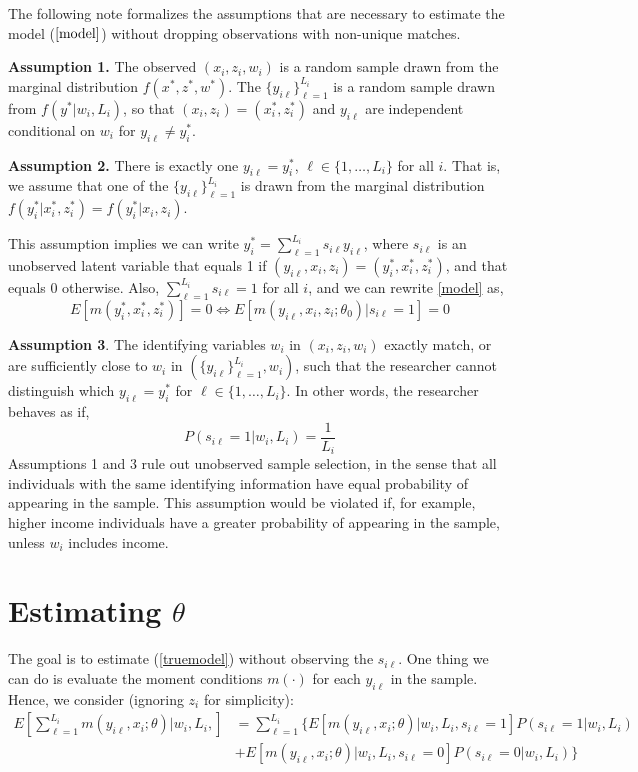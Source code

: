 \documentclass[12pt]{article}
\newcommand{\sumL}{\sum_{\ell=1}^{L_i}}
\begin{document}
The following note formalizes the assumptions that are necessary to estimate the model ($\ref{model}$) without dropping observations with non-unique matches.


\textbf{Assumption 1.} The observed $(x_i, z_i, w_i)$ is a random sample drawn from the marginal distribution $f(x^*, z^*, w^*)$.   The $\{y_{i\ell}\}_{\ell=1}^{L_i}$ is a random sample drawn from $f(y^* | w_i, L_i)$, so that $(x_i, z_i) = (x_i^*,z_i^*)$ and $y_{i\ell}$ are independent conditional on $w_i$ for $y_{i\ell} \neq y_i^*$. 

\textbf{Assumption 2.}  There is exactly one $y_{i\ell} = y_i^*$, $\ell\in \{1, \dots, L_i\}$ for all $i.$ That is, we assume that one of the $\{y_{i\ell}\}_{\ell=1}^{L_i}$ is drawn from the marginal distribution $f(y_i^* | x_i^*, z_i^*) = f(y_i^* | x_i, z_i)$.   

This assumption implies we can write $y_i^* = \sum_{\ell=1}^{L_i} s_{i\ell} y_{i\ell}$, where $s_{i\ell}$ is an unobserved latent variable that equals 1 if $(y_{i\ell}, x_i, z_i) = (y_i^*, x_i^*, z_i^*)$, and that equals 0 otherwise.  
Also, $\sum_{\ell=1}^{L_i} s_{i\ell} = 1$ for all $i$, and we can rewrite \ref{model} as,
\begin{equation} E\left[m(y_i^*, x_i^*, z_i^*)\right] = 0 \iff E\left[m(y_{i\ell},x_i,z_i; \theta_0) | s_{i\ell} =1 \right] = 0  \tag{$1^*$} \label{truemodel} \end{equation} 

\textbf{Assumption 3}. The identifying variables $w_i$ in $(x_i, z_i, w_i)$ exactly match, or are sufficiently close to $w_i$ in $(\{y_{i\ell}\}_{\ell=1}^{L_i}, w_i)$, such that the researcher cannot distinguish which $y_{i\ell} = y_i^*$ for $\ell \in \{1, \dots, L_i\}$.  In other words, the researcher behaves as if,  
$$P(s_{i\ell}=1 | w_i, L_i) = \frac{1}{L_i}$$ 
Assumptions 1 and 3 rule out unobserved sample selection, in the sense that all individuals with the same identifying information have equal probability of appearing in the sample.  This assumption would be violated if, for example, higher income individuals have a greater probability of appearing in the sample, unless $w_i$ includes income.   

\section{Estimating $\theta$}

The goal is to estimate (\ref{truemodel}) without observing the $s_{i\ell}$. One thing we can do is evaluate the moment conditions $m(\cdot)$ for each  $y_{i\ell}$ in the sample.  Hence, we consider (ignoring $z_i$ for simplicity):
\begin{align*}
    E\left[\sumL m\left(y_{i\ell}, x_i; \theta\right) \Bigg\vert w_i, L_i, \right] &=
    \sumL \Big\{ E[m(y_{i\ell}, x_i; \theta) | w_i, L_i, s_{i\ell}=1]P(s_{i\ell}=1| w_i, L_i) 
    \\&+ E[m(y_{i\ell}, x_i; \theta) | w_i, L_i, s_{i\ell}=0] P(s_{i\ell}=0| w_i, L_i) \Big\}
\end{align*}
   
\end{document}
